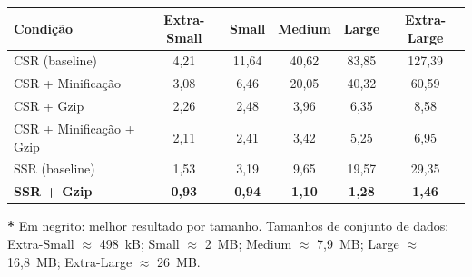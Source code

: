 \begin{table}[htbp]
\centering
\footnotesize
\caption{}
\begin{tabular}{|l|c|c|c|c|c|}
\hline
\textbf{Condição} & \textbf{Extra-Small} & \textbf{Small} & \textbf{Medium} & \textbf{Large} & \textbf{Extra-Large} \\
\hline
CSR (baseline)               & 4,21  & 11,64 & 40,62 & 83,85  & 127,39 \\
CSR + Minificação            & 3,08  &  6,46 & 20,05 & 40,32  &  60,59 \\
CSR + Gzip                   & 2,26  &  2,48 &  3,96 &  6,35  &   8,58 \\
CSR + Minificação + Gzip     & 2,11  &  2,41 &  3,42 &  5,25  &   6,95 \\
SSR (baseline)               & 1,53  &  3,19 &  9,65 & 19,57  &  29,35 \\
\textbf{SSR + Gzip}          & \textbf{0,93} & \textbf{0,94} & \textbf{1,10} & \textbf{1,28} & \textbf{1,46} \\
\hline
\end{tabular}
\vspace{2pt}
\begin{flushleft}
\footnotesize
\textbf{*} Em negrito: melhor resultado por tamanho.
Tamanhos de conjunto de dados: Extra-Small $\approx$ 498~kB; Small $\approx$ 2~MB; Medium $\approx$ 7,9~MB; Large $\approx$ 16,8~MB; Extra-Large $\approx$ 26~MB.
\end{flushleft}
\label{tab:lcp-medians}
\end{table}
